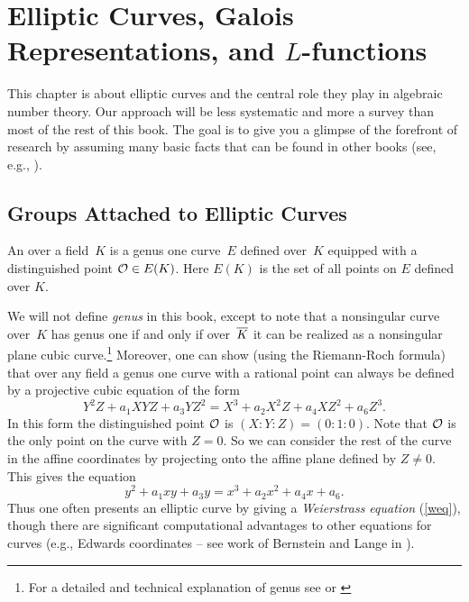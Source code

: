 \chapter[Elliptic Curves and $L$-functions]{Elliptic Curves, Galois Representations, and $L$-functions}

This chapter is about elliptic curves and the central role they play
in algebraic number theory.  Our approach will be less systematic and
more a survey than most of the rest of this book.  The goal is to
give you a glimpse of the forefront of research by assuming many basic
facts that can be found in other books (see, e.g.,
\cite{silverman:aec}).

\section{Groups Attached to Elliptic Curves}


\begin{definition}\label{defn:ec}
  An  over a field~$K$ is a genus one curve~$E$
  defined over~$K$ equipped with a distinguished point $\mathcal{O} \in E(K)$.
  Here $E(K)$ is the set of all points on $E$ defined over $K$.
\end{definition}
We will not define \emph{genus} in this book, except to note that a
nonsingular curve over~$K$ has genus one if and only if over~$\overline{K}$
it can be realized as a nonsingular plane cubic curve.\footnote{
	For a detailed and technical explanation of genus
	see \cite[Ch II.8]{hartshorne} or
	\cite[Ch 7.3]{liu2006algebraic}
}
Moreover, one
can show (using the Riemann-Roch formula) that over any field a genus
one curve with a rational point can always be defined by a projective
cubic equation of the form
$$
  Y^2 Z + a_1 XYZ + a_3 YZ^2  = X^3  + a_2 X^2Z + a_4 XZ^2 + a_6 Z^3.
$$
In this form the distinguished point $\mathcal{O}$ is $(X:Y:Z) = (0:1:0)$.
Note that $\mathcal{O}$ is the only point on the curve with $Z=0$. So we
can consider the rest of the curve in the affine coordinates
by projecting onto the affine plane defined by $Z\neq 0$.
This gives the equation
\begin{equation}\label{weq}
  y^2 +a_1 xy + a_3 y = x^3 + a_2 x^2 + a_4 x + a_6.
\end{equation}
Thus one often presents an elliptic curve by giving a {\em Weierstrass
  equation} (\ref{weq}), though there are significant computational
advantages to other equations for curves (e.g., Edwards coordinates --
see work of Bernstein and Lange in \cite{bernstein2007inverted}).

